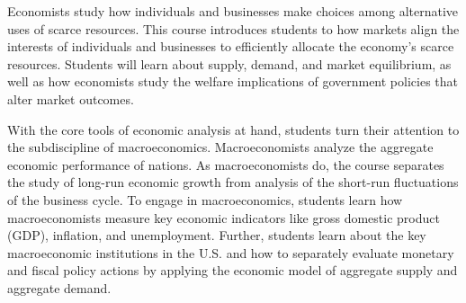 Economists study how individuals and businesses make choices among alternative uses of scarce resources. This course introduces students to how markets align the interests of individuals and businesses to efficiently allocate the economy's scarce resources. Students will learn about supply, demand, and market equilibrium, as well as how economists study the welfare implications of government policies that alter market outcomes.

With the core tools of economic analysis at hand, students turn their attention to the subdiscipline of macroeconomics. Macroeconomists analyze the aggregate economic performance of nations. As macroeconomists do, the course separates the study of long-run economic growth from analysis of the short-run fluctuations of the business cycle. To engage in macroeconomics, students learn how macroeconomists measure key economic indicators like gross domestic product (GDP), inflation, and unemployment. Further, students learn about the key macroeconomic institutions in the U.S. and how to separately evaluate monetary and fiscal policy actions by applying the economic model of aggregate supply and aggregate demand.
